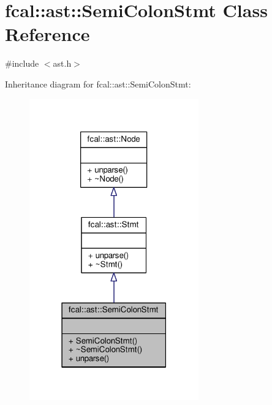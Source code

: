 \hypertarget{classfcal_1_1ast_1_1SemiColonStmt}{}\section{fcal\+:\+:ast\+:\+:Semi\+Colon\+Stmt Class Reference}
\label{classfcal_1_1ast_1_1SemiColonStmt}


{\ttfamily \#include $<$ast.\+h$>$}



Inheritance diagram for fcal\+:\+:ast\+:\+:Semi\+Colon\+Stmt\+:
\nopagebreak
\begin{figure}[H]
\begin{center}
\leavevmode
\includegraphics[width=207pt]{classfcal_1_1ast_1_1SemiColonStmt__inherit__graph}
\end{center}
\end{figure}



